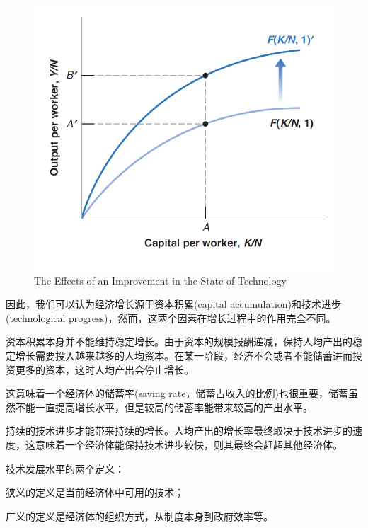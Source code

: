 \documentclass{article}
\begin{document}
\begin{figure}[H] %
	\centering %
	\includegraphics[width=1\textwidth]{10_2} %
	\caption{The Effects of an
		Improvement in the State
		of Technology} %
	\label{Fig.main3} %
\end{figure}

因此，我们可以认为经济增长源于资本积累(capital accumulation)和技术进步(technological progress)，然而，这两个因素在增长过程中的作用完全不同。

资本积累本身并不能维持稳定增长。由于资本的规模报酬递减，保持人均产出的稳定增长需要投入越来越多的人均资本。在某一阶段，经济不会或者不能储蓄进而投资更多的资本，这时人均产出会停止增长。

这意味着一个经济体的储蓄率(saving rate，储蓄占收入的比例)也很重要，储蓄虽然不能一直提高增长水平，但是较高的储蓄率能带来较高的产出水平。

\hspace*{\fill}

持续的技术进步才能带来持续的增长。人均产出的增长率最终取决于技术进步的速度，这意味着一个经济体能保持技术进步较快，则其最终会赶超其他经济体。

\hspace*{\fill}

技术发展水平的两个定义：

狭义的定义是当前经济体中可用的技术；

广义的定义是经济体的组织方式，从制度本身到政府效率等。







	
\end{document}
